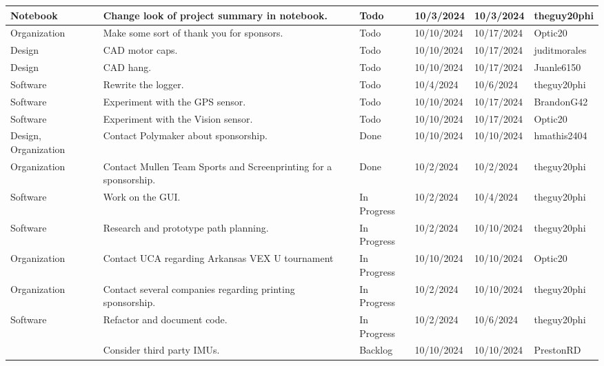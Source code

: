 \begin{center}
\begin{longtable}{| p{40pt} | p{150pt} | p{35pt} | p{33pt} | p{33pt} | p{40pt} |}
\hline \rowcolor{IndianRed1}
Notebook & Change look of project summary in notebook. & Todo & 10/3/2024 & 10/3/2024 & theguy20phi \\
\hline \rowcolor{IndianRed1}
Organization & Make some sort of thank you for sponsors. & Todo & 10/10/2024 & 10/17/2024 & Optic20 \\
\hline \rowcolor{IndianRed1}
Design & CAD motor caps. & Todo & 10/10/2024 & 10/17/2024 & juditmorales \\
\hline \rowcolor{IndianRed1}
Design & CAD hang. & Todo & 10/10/2024 & 10/17/2024 & Juanle6150 \\
\hline \rowcolor{IndianRed1}
Software & Rewrite the logger. & Todo & 10/4/2024 & 10/6/2024 & theguy20phi \\
\hline \rowcolor{IndianRed1}
Software & Experiment with the GPS sensor. & Todo & 10/10/2024 & 10/17/2024 & BrandonG42 \\
\hline \rowcolor{IndianRed1}
Software & Experiment with the Vision sensor. & Todo & 10/10/2024 & 10/17/2024 & Optic20 \\
\hline \rowcolor{DarkSeaGreen1}
Design, Organization & Contact Polymaker about sponsorship. & Done & 10/10/2024 & 10/10/2024 & hmathis2404 \\
\hline \rowcolor{DarkSeaGreen1}
Organization & Contact Mullen Team Sports and Screenprinting for a sponsorship. & Done & 10/2/2024 & 10/2/2024 & theguy20phi \\
\hline \rowcolor{LightGoldenrod1}
Software & Work on the GUI. & In Progress & 10/2/2024 & 10/4/2024 & theguy20phi \\
\hline \rowcolor{LightGoldenrod1}
Software & Research and prototype path planning. & In Progress & 10/2/2024 & 10/10/2024 & theguy20phi \\
\hline \rowcolor{LightGoldenrod1}
Organization & Contact UCA regarding Arkansas VEX U tournament & In Progress & 10/10/2024 & 10/10/2024 & Optic20 \\
\hline \rowcolor{LightGoldenrod1}
Organization & Contact several companies regarding printing sponsorship. & In Progress & 10/2/2024 & 10/10/2024 & theguy20phi \\
\hline \rowcolor{LightGoldenrod1}
Software & Refactor and document code. & In Progress & 10/2/2024 & 10/6/2024 & theguy20phi \\
\hline \rowcolor{Ivory2}
& Consider third party IMUs. & Backlog & 10/10/2024 & 10/10/2024 & PrestonRD \\
\hline
\end{longtable}
\end{center}


